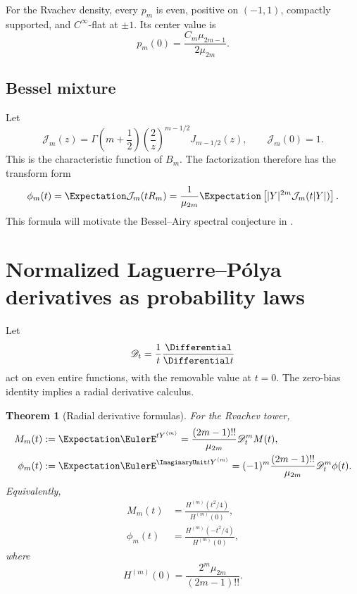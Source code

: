\documentclass[11pt,oneside]{article}
\newtheorem{theorem}{Theorem}[section]
\theoremstyle{definition}
\theoremstyle{remark}
\newcommand{\Dop}{\mathscr D}
\newcommand{\Tower}[1]{Y^{\langle #1\rangle}}
\begin{document}
For the Rvachev density, every $p_m$ is even, positive on $(-1,1)$, compactly
supported, and $C^\infty$-flat at $\pm1$.  Its center value is
\begin{equation}
 p_m(0)=\frac{C_m\mu_{2m-1}}{2\mu_{2m}}.            \label{eq:pm-center}
\end{equation}

\subsection{Bessel mixture}

Let
\begin{equation}
 \mathcal J_m(z)
 =\Gamma\!\left(m+\frac12\right)
  \left(\frac2z\right)^{m-1/2}J_{m-1/2}(z),
 \qquad \mathcal J_m(0)=1.                          \label{eq:Jm}
\end{equation}
This is the characteristic function of $B_m$.  The factorization therefore
has the transform form
\begin{equation}
 \phi_m(t)
 =\Expectation\mathcal J_m(tR_m)
 =\frac{1}{\mu_{2m}}
   \Expectation\left[|Y|^{2m}\mathcal J_m(t|Y|)\right].       \label{eq:Bessel-mixture}
\end{equation}
This formula will motivate the Bessel--Airy spectral conjecture in
.

\section{Normalized Laguerre--P\'olya derivatives as probability laws}
\label{sec:LP-tower}

Let
\begin{equation}
 \Dop_t=\frac1t\frac{\Differential}{\Differential t}                  \label{eq:radial-D}
\end{equation}
act on even entire functions, with the removable value at $t=0$.  The zero-bias
identity implies a radial derivative calculus.

\begin{theorem}[Radial derivative formulas]
\label{thm:radial-derivatives}
For the Rvachev tower,
\begin{align}
 M_m(t)&:=\Expectation\EulerE^{t\Tower{m}}
   =\frac{(2m-1)!!}{\mu_{2m}}\Dop_t^m M(t),          \label{eq:Mm-radial}\\
 \phi_m(t)&:=\Expectation\EulerE^{\ImaginaryUnit t\Tower{m}}
   =(-1)^m\frac{(2m-1)!!}{\mu_{2m}}\Dop_t^m\phi(t). \label{eq:phim-radial}
\end{align}
Equivalently,
\begin{align}
 M_m(t)&=\frac{H^{(m)}(t^2/4)}{H^{(m)}(0)},          \label{eq:Mm-Hderiv}\\
 \phi_m(t)&=\frac{H^{(m)}(-t^2/4)}{H^{(m)}(0)},      \label{eq:phim-Hderiv}
\end{align}
where
\begin{equation}
 H^{(m)}(0)=\frac{2^m\mu_{2m}}{(2m-1)!!}.           \label{eq:Hm-zero}
\end{equation}
\end{theorem}
\end{document}
